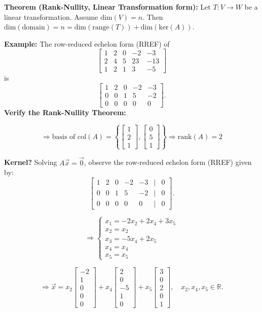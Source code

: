 \documentclass{article}
\begin{document}
\textbf{Theorem (Rank-Nullity, Linear Transformation form):}
Let $T: V \rightarrow W$ be a linear transformation. Assume $\text{dim}(V) = n$. Then $\text{dim}(\text{domain}) = n = \text{dim}(\text{range}(T)) + \text{dim}(\text{ker}(A))$.

\textbf{Example:} The row-reduced echelon form (RREF) of 
\[
\begin{bmatrix} 
1 & 2 & 0 & -2 & -3 \\ 
2 & 4 & 5 & 23 & -13 \\ 
1 & 2 & 1 & 3 & -5 
\end{bmatrix} 
\]
is 
\[
\begin{bmatrix} 
1 & 2 & 0 & -2 & -3 \\ 
0 & 0 & 1 & 5 & -2 \\ 
0 & 0 & 0 & 0 & 0 
\end{bmatrix}.
\]
\textbf{Verify the Rank-Nullity Theorem:}

\[\Rightarrow \text{basis of } \text{col}(A) = \left\{ \begin{bmatrix} 1 \\ 2 \\ 1 \end{bmatrix}, \begin{bmatrix} 0 \\ 5 \\ 1 \end{bmatrix} \right\} \Rightarrow \text{rank}(A) = 2\]

\textbf{Kernel?} Solving $A\vec{x} = \vec{0}$, observe the row-reduced echelon form (RREF) given by:
\[ \begin{bmatrix} 
1 & 2 & 0 & -2 & -3 & \vert & 0 \\ 
0 & 0 & 1 & 5 & -2 & \vert & 0 \\ 
0 & 0 & 0 & 0 & 0 & \vert & 0 
\end{bmatrix}.\]

\[\Rightarrow
\begin{cases}
x_1 = -2x_2 + 2x_4 + 3x_5 \\
x_2 = x_2 \\
x_3 = -5x_4 + 2x_5 \\
x_4 = x_4 \\
x_5 = x_5
\end{cases}\]

\[\Rightarrow \vec{x} = x_2 \begin{bmatrix} -2 \\ 1 \\ 0 \\ 0 \\ 0 \end{bmatrix} + x_4 \begin{bmatrix} 2 \\ 0 \\ -5 \\ 1 \\ 0 \end{bmatrix} + x_5 \begin{bmatrix} 3 \\ 0 \\ 2 \\ 0 \\ 1 \end{bmatrix}, \quad x_2, x_4, x_5 \in \mathbb{R}.\]
\end{document}
